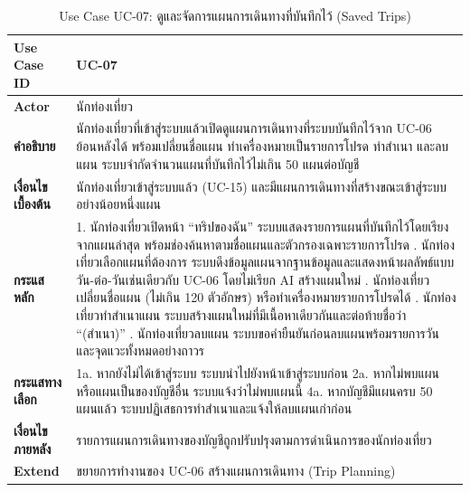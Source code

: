 \begin{table}[H]
\centering
\caption{Use Case UC-07: ดูและจัดการแผนการเดินทางที่บันทึกไว้ (Saved Trips)}
\label{tab:uc07}
\begin{tabular}{|p{3.2cm}|p{10cm}|}
\hline
\textbf{Use Case ID} & UC-07 \\ \hline
\textbf{Actor} & นักท่องเที่ยว \\ \hline
\textbf{คำอธิบาย} & นักท่องเที่ยวที่เข้าสู่ระบบแล้วเปิดดูแผนการเดินทางที่ระบบบันทึกไว้จาก UC-06 ย้อนหลังได้ พร้อมเปลี่ยนชื่อแผน ทำเครื่องหมายเป็นรายการโปรด ทำสำเนา และลบแผน ระบบจำกัดจำนวนแผนที่บันทึกไว้ไม่เกิน 50 แผนต่อบัญชี \\ \hline
\textbf{เงื่อนไขเบื้องต้น} & นักท่องเที่ยวเข้าสู่ระบบแล้ว (UC-15) และมีแผนการเดินทางที่สร้างขณะเข้าสู่ระบบอย่างน้อยหนึ่งแผน \\ \hline
\textbf{กระแสหลัก} & 1. นักท่องเที่ยวเปิดหน้า ``ทริปของฉัน'' ระบบแสดงรายการแผนที่บันทึกไว้โดยเรียงจากแผนล่าสุด พร้อมช่องค้นหาตามชื่อแผนและตัวกรองเฉพาะรายการโปรด \newline 2. นักท่องเที่ยวเลือกแผนที่ต้องการ ระบบดึงข้อมูลแผนจากฐานข้อมูลและแสดงหน้าผลลัพธ์แบบวัน-ต่อ-วันเช่นเดียวกับ UC-06 โดยไม่เรียก AI สร้างแผนใหม่ \newline 3. นักท่องเที่ยวเปลี่ยนชื่อแผน (ไม่เกิน 120 ตัวอักษร) หรือทำเครื่องหมายรายการโปรดได้ \newline 4. นักท่องเที่ยวทำสำเนาแผน ระบบสร้างแผนใหม่ที่มีเนื้อหาเดียวกันและต่อท้ายชื่อว่า ``(สำเนา)'' \newline 5. นักท่องเที่ยวลบแผน ระบบขอคำยืนยันก่อนลบแผนพร้อมรายการวันและจุดแวะทั้งหมดอย่างถาวร \\ \hline
\textbf{กระแสทางเลือก} & 1a. หากยังไม่ได้เข้าสู่ระบบ ระบบนำไปยังหน้าเข้าสู่ระบบก่อน \newline 2a. หากไม่พบแผน หรือแผนเป็นของบัญชีอื่น ระบบแจ้งว่าไม่พบแผนนี้ \newline 4a. หากบัญชีมีแผนครบ 50 แผนแล้ว ระบบปฏิเสธการทำสำเนาและแจ้งให้ลบแผนเก่าก่อน \\ \hline
\textbf{เงื่อนไขภายหลัง} & รายการแผนการเดินทางของบัญชีถูกปรับปรุงตามการดำเนินการของนักท่องเที่ยว \\ \hline
\textbf{Extend} & ขยายการทำงานของ UC-06 สร้างแผนการเดินทาง (Trip Planning) \\
\hline
\end{tabular}
\end{table}

